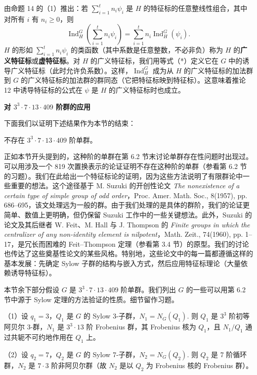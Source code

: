 由命题 14 的（1）推出：若 \(\sum_{i=1}^{t}n_i\psi_i\) 是 \(H\) 的特征标的任意整线性组合，其中对所有 \(i\) 有 \(n_i \geq 0\)，则
\[
\operatorname{Ind}_H^G\left(\sum_{i=1}^{t}n_i\psi_i\right) = \sum_{i=1}^{t}n_i\operatorname{Ind}_H^G(\psi_i). \tag{*}
\]
\(H\) 的形如 \(\sum_{i=1}^{t}n_i\psi_i\) 的类函数（其中系数是任意整数，不必非负）称为 \(H\) 的\textbf{广义特征标}或\textbf{虚特征标}。对 \(H\) 的广义特征标，我们用等式（*）定义它在 \(G\) 中的诱导广义特征标（此时允许负系数）。这样，\(\operatorname{Ind}_H^G\) 成为从 \(H\) 的广义特征标的加法群到 \(G\) 的广义特征标的加法群的群同态（它把特征标映到特征标）。这意味着推论 12 中诱导特征标的公式在 \(\psi\) 是 \(H\) 的广义特征标时也成立。

\noindent\textbf{对 \(3^3\cdot 7\cdot 13\cdot 409\) 阶群的应用}

下面我们以证明下述结果作为本节的结束：

\noindent 不存在 \(3^3\cdot 7\cdot 13\cdot 409\) 阶单群。

正如本节开头提到的，这种阶的单群在第 6.2 节末讨论单群存在性问题时出现过。可以用涉及一个 819 次置换表示的论证证明不存在这种阶的单群（参看第 6.2 节的习题）。我们在此给出一个特征标论的证明，因为这些方法说明了有限群论中一些重要的想法。这个途径基于 M. Suzuki 的开创性论文 \textit{The nonexistence of a certain type of simple group of odd order}，Proc. Amer. Math. Soc., 8(1957), pp. 686--695，该文处理远为一般的群。由于我们处理的是具体的群阶，我们的论证更简单、数值上更明确，但仍保留 Suzuki 工作中的一些关键想法。此外，Suzuki 的论文及其后继者 W. Feit、M. Hall 与 J. Thompson 的 \textit{Finite groups in which the centralizer of any non-identity element is nilpotent}，Math. Zeit., 74(1960), pp. 1--17，是冗长而困难的 Feit--Thompson 定理（参看第 3.4 节）的原型。我们的讨论也传达了这些奠基性论文的某些风格。特别地，这些论文中的每一篇都遵循这样的基本发展：先确定 Sylow 子群的结构与嵌入方式，然后应用特征标理论（大量依赖诱导特征标）。

本节余下部分假设 \(G\) 是 \(3^3\cdot 7\cdot 13\cdot 409\) 阶单群。我们列出 \(G\) 的一些可以用第 6.2 节中源于 Sylow 定理的方法验证的性质。细节留作习题。

（1）设 \(q_1 = 3\)，\(Q_1\) 是 \(G\) 的 Sylow 3-子群，\(N_1 = N_G(Q_1)\). 则 \(Q_1\) 是 \(3^3\) 阶初等阿贝尔 3-群，\(N_1\) 是 \(3^3\cdot 13\) 阶 Frobenius 群，其 Frobenius 核为 \(Q_1\)，且 \(N_1/Q_1\) 通过共轭不可约地作用在 \(Q_1\) 上。

（2）设 \(q_2 = 7\)，\(Q_2\) 是 \(G\) 的 Sylow 7-子群，\(N_2 = N_G(Q_2)\). 则 \(Q_2\) 是 7 阶循环群，\(N_2\) 是 \(7\cdot 3\) 阶非阿贝尔群（故 \(N_2\) 是以 \(Q_2\) 为 Frobenius 核的 Frobenius 群）。

